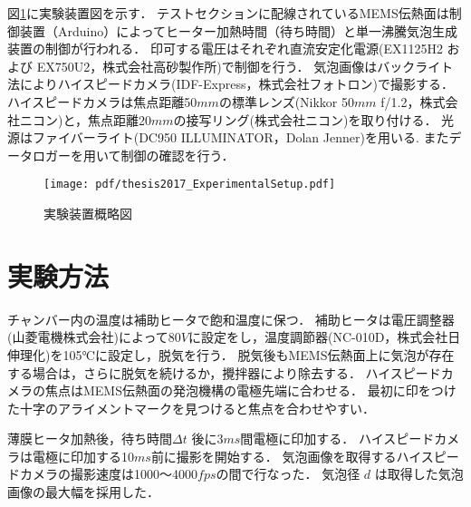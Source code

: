 図\ref{ExperimentalSetup}に実験装置図を示す．
テストセクションに配線されているMEMS伝熱面は制御装置（Arduino）によってヒーター加熱時間（待ち時間）と単一沸騰気泡生成装置の制御が行われる．
印可する電圧はそれぞれ直流安定化電源(EX1125H2 および EX750U2，株式会社高砂製作所)で制御を行う．
気泡画像はバックライト法によりハイスピードカメラ(IDF-Express，株式会社フォトロン)で撮影する．
ハイスピードカメラは焦点距離50$ mm $の標準レンズ(Nikkor 50$ mm $ f/1.2，株式会社ニコン)と，焦点距離20$ mm $の接写リング(株式会社ニコン)を取り付ける．
光源はファイバーライト(DC950 ILLUMINATOR，Dolan Jenner)を用いる.
またデータロガーを用いて制御の確認を行う．

\begin{figure}[ht]
\vspace{2zh}
\begin{center}
  \texttt{[image: pdf/thesis2017\_ExperimentalSetup.pdf]}
  \vspace{0zh}
  \caption{実験装置概略図}\label{ExperimentalSetup}
 \end{center}
 \vspace{1zh}
\end{figure}
\clearpage



\section{実験方法}
チャンバー内の温度は補助ヒータで飽和温度に保つ．
補助ヒータは電圧調整器(山菱電機株式会社)によって80$ V $に設定をし，温度調節器(NC-010D，株式会社日伸理化)を105$ ℃ $に設定し，脱気を行う．
脱気後もMEMS伝熱面上に気泡が存在する場合は，さらに脱気を続けるか，攪拌器により除去する．
ハイスピードカメラの焦点はMEMS伝熱面の発泡機構の電極先端に合わせる．
最初に印をつけた十字のアライメントマークを見つけると焦点を合わせやすい．

薄膜ヒータ加熱後，待ち時間$\Delta t$ 後に3$ ms $間電極に印加する．
ハイスピードカメラは電極に印加する10$ ms $前に撮影を開始する．
気泡画像を取得するハイスピードカメラの撮影速度は1000〜4000$ fps $の間で行なった．
気泡径 $d$ は取得した気泡画像の最大幅を採用した．















